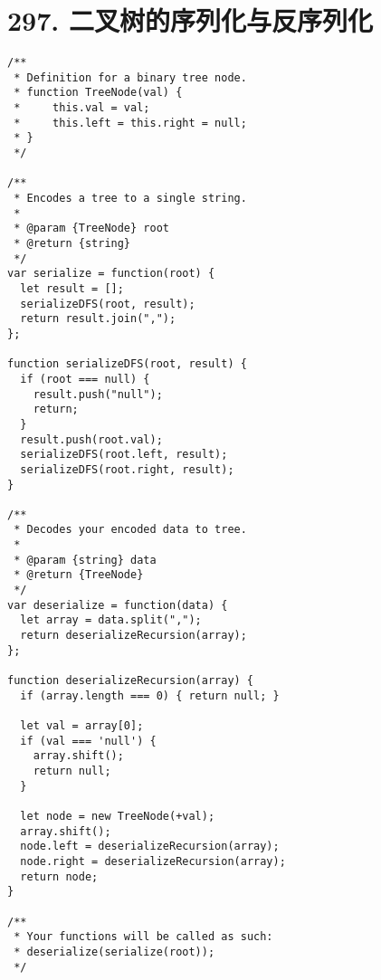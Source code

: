 \newpage
\section{297. 二叉树的序列化与反序列化}
\label{leetcode:297}

\begin{verbatim}
/**
 * Definition for a binary tree node.
 * function TreeNode(val) {
 *     this.val = val;
 *     this.left = this.right = null;
 * }
 */

/**
 * Encodes a tree to a single string.
 *
 * @param {TreeNode} root
 * @return {string}
 */
var serialize = function(root) {
  let result = [];
  serializeDFS(root, result);
  return result.join(",");
};

function serializeDFS(root, result) {
  if (root === null) {
    result.push("null");
    return;
  }
  result.push(root.val);
  serializeDFS(root.left, result);
  serializeDFS(root.right, result);
}

/**
 * Decodes your encoded data to tree.
 *
 * @param {string} data
 * @return {TreeNode}
 */
var deserialize = function(data) {
  let array = data.split(",");
  return deserializeRecursion(array);
};

function deserializeRecursion(array) {
  if (array.length === 0) { return null; }

  let val = array[0];
  if (val === 'null') {
    array.shift();
    return null;
  }

  let node = new TreeNode(+val);
  array.shift();
  node.left = deserializeRecursion(array);
  node.right = deserializeRecursion(array);
  return node;
}

/**
 * Your functions will be called as such:
 * deserialize(serialize(root));
 */
\end{verbatim}